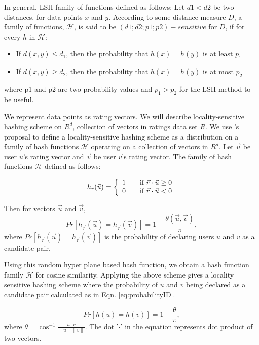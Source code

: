 \documentclass[conference]{IEEEtran}
\begin{document}
In general, LSH family of functions defined as follows: Let $d1 < d2$ be two
distances, for data points $x$ and $y$. According to some distance measure $D$,
a family of functions, $\mathcal{H}$, is said to be $(d1; d2; p1; p2)-sensitive$ 
for $D$, if for every $h$ in $\mathcal{H}$:

\begin{itemize}
\item If $d(x, y) \leq d_1$, then the probability that $h(x) = h(y)$ is at least $p_1$
\item If $d(x, y) \geq d_2$, then the probability that $h(x) = h(y)$ is at most $p_2$
\end{itemize}

where p1 and p2 are two probability values and $p_1 > p_2$ for the LSH method
to be useful.

We represent data points as rating vectors. We will describe locality-sensitive
hashing scheme on $R^d$, collection of vectors in ratings data set $R$. We use
\cite{DBLP:conf/stoc/Charikar02}'s proposal to define a locality-sensitive 
hashing scheme as a distribution on a family of hash functions $\mathcal{H}$
operating on a collection of vectors in $R^d$. Let $\vec{u}$ be user $u$'s 
rating vector and $\vec{v}$ be user $v$'s rating vector. The family of hash 
functions $\mathcal{H}$ defined as follows:

\begin{equation}
h_{\vec{r}}(\vec{u}) = \left\{ 
  \begin{array}{l l}
    1 & \quad \text{if  } \vec{r} \cdot \vec{u} \geq 0 \\
    0 & \quad \text{if  } \vec{r} \cdot \vec{u}  < 0
  \end{array} \right.
\label{eq:hashing}
\end{equation}

Then for vectors $\vec{u}$ and $\vec{v}$,
$$
 Pr[h_{\vec{r}}(\vec{u}) = h_{\vec{r}}(\vec{v})] = 
 1 - \frac{\theta(\vec{u},\vec{v})}{\pi},
$$
where $Pr[h_{\vec{r}}(\vec{u}) = h_{\vec{r}}(\vec{v})]$ is the probability 
of declaring users $u$ and $v$ as a candidate pair.

Using this random hyper plane based hash function, we obtain a hash function 
family $\mathcal{H}$ for cosine similarity. Applying the above scheme gives a 
locality sensitive hashing scheme where the probability of $u$ and $v$ being declared as a candidate pair calculated as in Eqn. \ref{eq:probabilityID}.

\begin{equation}
 Pr[h(u)=h(v)] = 1 - \frac{\theta}{\pi} ,
\label{eq:probabilityID}
\end{equation}
where $\theta = \cos^{-1} \frac{u \cdot v}{\parallel u \parallel \parallel v 
\parallel}$. The dot '$\cdot$' in the equation represents dot product of two 
vectors. 
\end{document}
